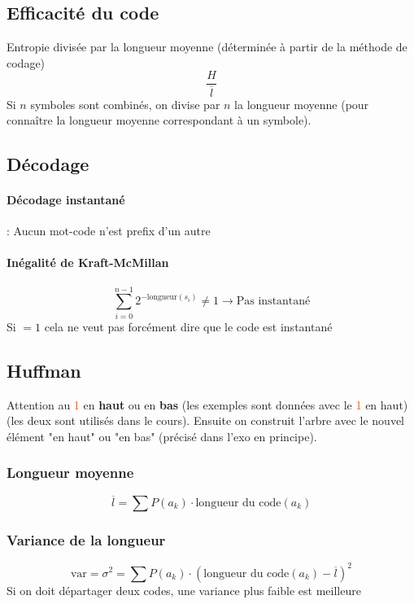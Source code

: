 \documentclass[resume]{subfiles}
\begin{document}
\subsection{Efficacité du code}
Entropie divisée par la longueur moyenne (déterminée à partir de la méthode de codage)
$$\frac{H}{\overline{l}}$$
Si $n$ symboles sont combinés, on divise par $n$ la longueur moyenne (pour connaître la longueur moyenne correspondant à un symbole).
\subsection{Décodage}
\paragraph{Décodage instantané} : Aucun mot-code n'est prefix d'un autre
\paragraph{Inégalité de Kraft-McMillan}
$$\sum_{i=0}^{n-1}2^{-\text{longueur}(s_i)}\neq 1\longrightarrow \text{Pas instantané}$$
Si $=1$ cela ne veut pas forcément dire que le code est instantané
\subsection{Huffman}
Attention au \textcolor{OrangeRed}{1} en \textbf{haut} ou en \textbf{bas} (les exemples sont données avec le \textcolor{OrangeRed}{1} en haut) (les deux sont utilisés dans le cours). Ensuite on construit l'arbre avec le nouvel élément "en haut" ou "en bas" (précisé dans l'exo en principe).\\
\subsubsection{Longueur moyenne}
$$\overline{l}=\sum P(a_k)\cdot \text{longueur du code}(a_k)$$
\subsubsection{Variance de la longueur}
$$\text{var}=\sigma^2=\sum P(a_k)\cdot \left(\text{longueur du code}(a_k)-\overline{l}\right)^2$$
Si on doit départager deux codes, une variance plus faible est meilleure
\end{document}
